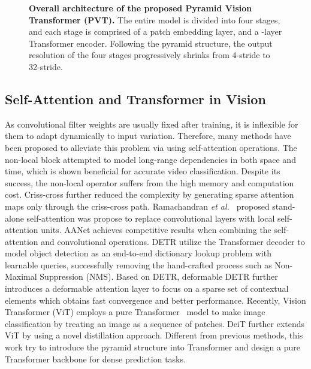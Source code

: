 \documentclass[10pt,twocolumn,letterpaper]{article}
\def\etal{{\em et al.~}}
\begin{document}
\begin{figure*}[t]
		\centering
		\setlength{\fboxrule}{0pt}
		\caption{\textbf{Overall architecture of the proposed Pyramid Vision Transformer (PVT).} The entire model is divided into four stages, and each stage is comprised of a patch embedding layer, and a -layer Transformer encoder. Following the pyramid structure, the output resolution of the four stages progressively shrinks from 
4-stride
		to 
32-stride.}
		\label{fig:arch}
\end{figure*}
\subsection{Self-Attention and Transformer in Vision}
As convolutional filter weights are usually fixed after training, it is inflexible for them to adapt dynamically to input variation. Therefore, many methods have been proposed to alleviate this problem via using self-attention operations.
The non-local block \cite{wang2018non} attempted to model long-range dependencies in both space and time, which is shown beneficial for accurate video classification.
Despite its success, the non-local operator suffers from the high memory and computation cost. Criss-cross \cite{huang2019ccnet} further reduced the complexity by generating sparse attention maps only through the criss-cross path. Ramachandran \etal\cite{ramachandran2019stand} proposed stand-alone self-attention  was propose to replace convolutional layers with local self-attention units. AANet \cite{bello2019attention} achieves competitive results when combining the self-attention and convolutional operations.
DETR \cite{carion2020end} utilize the Transformer decoder to model object detection as an end-to-end dictionary lookup problem with learnable queries,
successfully removing the hand-crafted process such as Non-Maximal Suppression (NMS). 
Based on DETR, deformable DETR \cite{zhu2020deformable} further introduces a deformable attention layer to focus on a sparse set of contextual elements which obtains fast convergence and better performance.
Recently, Vision Transformer (ViT) \cite{dosovitskiy2020image} employs a pure Transformer~\cite{vaswani2017attention} model to make image classification by treating an image as a sequence of patches.
DeiT \cite{touvron2020training} further extends ViT by using a novel distillation approach. 
Different from previous methods, this work try to introduce the pyramid structure into Transformer and design a pure Transformer backbone for dense prediction tasks.
\end{document}
